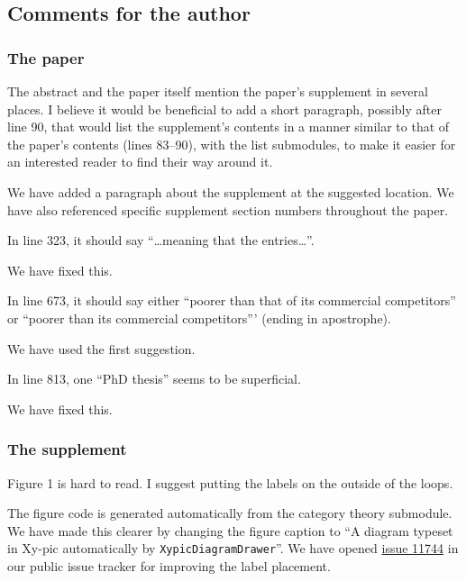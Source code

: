 \documentclass[answers,12pt]{exam}
\begin{document}
\subsection{Comments for the author}
\subsubsection{The paper}

\begin{questions}
\question The abstract and the paper itself mention the paper's supplement in several places. I believe it would be beneficial to add a short paragraph, possibly after line 90, that would list the supplement's contents in a manner similar to that of the paper's contents (lines 83--90), with the list submodules, to make it easier for an interested reader to find their way around it.
\begin{solution}
We have added a paragraph about the supplement at the suggested location. We
have also referenced specific supplement section numbers throughout the
paper.
\end{solution}

\question In line 323, it should say ``\ldots meaning that the entries\ldots''.
\begin{solution}
We have fixed this.
\end{solution}

\question In line 673, it should say either ``poorer than that of its commercial competitors'' or ``poorer than its commercial competitors''' (ending in apostrophe).
\begin{solution}
We have used the first suggestion.
\end{solution}

\question In line 813, one ``PhD thesis'' seems to be superficial.
\begin{solution}
We have fixed this.
\end{solution}

\subsubsection{The supplement}

\question Figure 1 is hard to read. I suggest putting the labels on the outside of the loops.
\begin{solution}
The figure code is generated automatically from the category theory submodule. We
have made this clearer by changing the figure caption to ``A diagram typeset
in Xy-pic automatically by \texttt{XypicDiagramDrawer}''. We have opened
\href{https://github.com/sympy/sympy/issues/11744}{issue 11744} in our public
issue tracker for improving the label placement.
\end{solution}


\end{questions}
\end{document}
